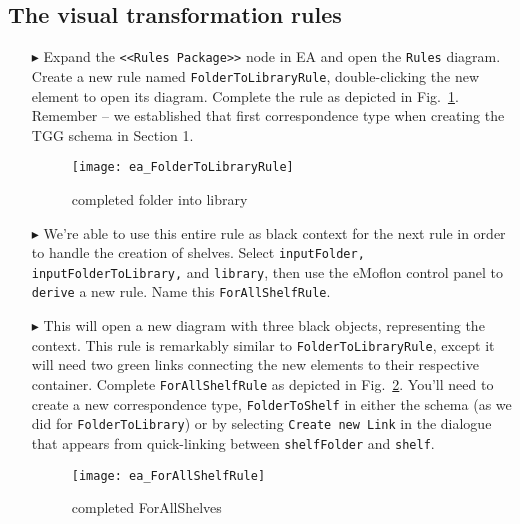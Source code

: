 \newpage
\hypertarget{treeToModel vis}{}
\subsection{The visual transformation rules}
\visHeader

\begin{itemize}

\item[$\blacktriangleright$] Expand the \texttt{<<Rules Package>>} node in EA and open the \texttt{Rules} diagram. Create a new rule named
\texttt{FolderToLibraryRule}, double-clicking the new element to open its diagram. Complete the rule as depicted in Fig.~\ref{ea:FolderIntoLibrary_Complete}.
Remember -- we established that first correspondence type when creating the TGG schema in Section 1.

\vspace{0.5cm}

\begin{figure}[htbp]
\begin{center}
  \texttt{[image: ea\_FolderToLibraryRule]}
  \caption{completed folder into library}
  \label{ea:FolderIntoLibrary_Complete}
\end{center}
\end{figure}

\item[$\blacktriangleright$] We're able to use this entire rule as black context for the next rule in order to handle the creation of shelves. Select
\texttt{inputFolder, inputFolderToLibrary,} and \texttt{library}, then use the eMoflon control panel to \texttt{derive} a new rule. Name this \texttt{ForAllShelfRule}.

\item[$\blacktriangleright$] This will open a new diagram with three black objects, representing the context. This rule is remarkably similar to
\texttt{FolderToLibraryRule}, except it will need two green links connecting the new elements to their respective container. Complete \texttt{ForAllShelfRule}
as depicted in Fig.~\ref{ea:ForAllShelves_Complete}. You'll need to create a new correspondence type, \texttt{FolderToShelf} in either the schema (as we did
for \texttt{FolderToLibrary}) or by selecting \texttt{Create new Link} in the dialogue that appears from quick-linking between \texttt{shelfFolder} and
\texttt{shelf}.

\vspace{0.5cm}

\begin{figure}[htbp]
\begin{center}
  \texttt{[image: ea\_ForAllShelfRule]}
  \caption{completed ForAllShelves}
  \label{ea:ForAllShelves_Complete}
\end{center}
\end{figure}


\end{itemize}
